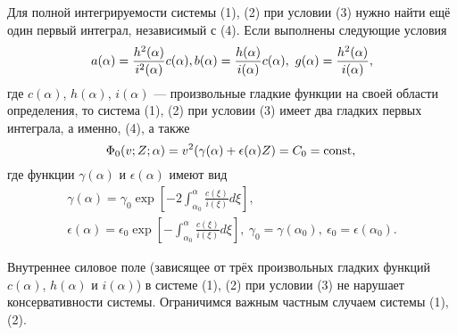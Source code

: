Для полной интегрируемости системы (1), (2) при условии (3) нужно
найти ещё один первый интеграл, независимый с (4).
Если выполнены следующие условия
$$
a(\alpha)=\frac{h^2(\alpha)}{i^2(\alpha)}c(\alpha),\\
b(\alpha)=\frac{h(\alpha)}{i(\alpha)}c(\alpha),~g(\alpha)=\frac{h^2(\alpha)}{i(\alpha)},
$$
где $c(\alpha)$, $h(\alpha)$, $i(\alpha)$ --- произвольные гладкие
функции на своей области определения, то система (1), (2) при
условии (3) имеет два гладких первых интеграла, а именно, (4), а
также
$$
\Phi_0(v;Z;\alpha)=v^2(\gamma(\alpha)+\epsilon(\alpha)Z)=C_0=\textrm{const},\\
$$
где функции $\gamma(\alpha)$ и $\epsilon(\alpha)$ имеют вид
$$
\begin{array}{c}
\gamma(\alpha)=\gamma_0\exp\left[-2\int_{\alpha_0}^{\alpha}\frac{c(\xi)}{i(\xi)}d\xi\right],\\
\epsilon(\alpha)=\epsilon_0\exp\left[-\int_{\alpha_0}^{\alpha}\frac{c(\xi)}{i(\xi)}d\xi\right],~
\gamma_0=\gamma(\alpha_0),~\epsilon_0=\epsilon(\alpha_0).
\end{array}
$$



Внутреннее силовое поле (зависящее от трёх произвольных гладких
функций $c(\alpha)$, $h(\alpha)$ и $i(\alpha)$) в системе (1), (2)
при условии (3) не нарушает консервативности системы. Ограничимся
важным частным случаем системы (1), (2).

